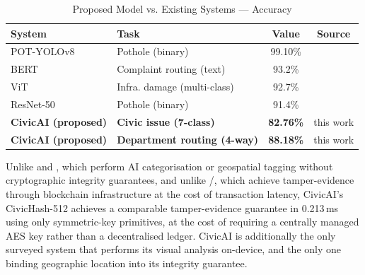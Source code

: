 \documentclass[conference]{IEEEtran}
\begin{document}
\begin{table}[t]
\caption{Proposed Model vs. Existing Systems --- Accuracy}
\label{tab:aiacc}
\centering
\small
\begin{tabular}{llcc}
\toprule
\textbf{System} & \textbf{Task} & \textbf{Value} & \textbf{Source} \\
\midrule
POT-YOLOv8            & Pothole (binary)   & 99.10\% & \cite{l1potyolo} \\
BERT                  & Complaint routing (text) & 93.2\% & \cite{almahmoud2023bert} \\
ViT                   & Infra. damage (multi-class) & 92.7\% & \cite{l10quantizedvlm} \\
ResNet-50             & Pothole (binary)   & 91.4\% & \cite{zhang2021resnet} \\
\midrule
\textbf{CivicAI (proposed)} & \textbf{Civic issue (7-class)} & \textbf{82.76\%} & this work \\
\textbf{CivicAI (proposed)} & \textbf{Department routing (4-way)} & \textbf{88.18\%} & this work \\
\bottomrule
\end{tabular}
\end{table}

Unlike \cite{l13citysolution} and \cite{l14civicconnect}, which perform AI categorisation or geospatial tagging without cryptographic integrity guarantees, and unlike \cite{l16scchain}/\cite{l17decentralizedtrust}, which achieve tamper-evidence through blockchain infrastructure at the cost of transaction latency, CivicAI's CivicHash-512 achieves a comparable tamper-evidence guarantee in 0.213\,ms using only symmetric-key primitives, at the cost of requiring a centrally managed AES key rather than a decentralised ledger. CivicAI is additionally the only surveyed system that performs its visual analysis on-device, and the only one binding geographic location into its integrity guarantee.
\end{document}
